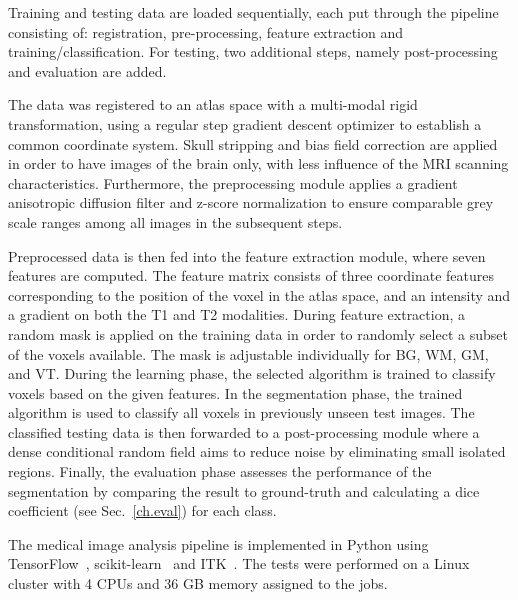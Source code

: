 \documentclass[journal]{IEEEtran}
\begin{document}
Training and testing data are loaded sequentially, each put through the pipeline consisting of: registration, pre-processing, feature extraction and training/classification. For testing, two additional steps, namely post-processing and evaluation are added.

The data was registered to an atlas space with a multi-modal rigid transformation, using a regular step gradient descent optimizer to establish a common coordinate system. Skull stripping and bias field correction are applied in order to have images of the brain only, with less influence of the MRI scanning characteristics. Furthermore, the preprocessing module applies a gradient anisotropic diffusion filter and z-score normalization to ensure comparable grey scale ranges among all images in the subsequent steps.

Preprocessed data is then fed into the feature extraction module, where seven features are computed. The feature matrix consists of three coordinate features corresponding to the position of the voxel in the atlas space, and an intensity and a gradient on both the T1 and T2 modalities. During feature extraction, a random mask is applied on the training data in order to randomly select a subset of the voxels available. The mask is adjustable individually for BG, WM, GM, and VT. During the learning phase, the selected algorithm is trained to classify voxels based on the given features. In the segmentation phase, the trained algorithm is used to classify all voxels in previously unseen test images. The classified testing data is then forwarded to a post-processing module where a dense conditional random field \cite{krahenbuhl2011efficient} aims to reduce noise by eliminating small isolated regions. Finally, the evaluation phase assesses the performance of the segmentation by comparing the result to ground-truth and calculating a dice coefficient (see Sec.~\ref{ch.eval}) for each class.

The medical image analysis pipeline is implemented in Python using TensorFlow~\cite{tensorflow2015-whitepaper}, scikit-learn~\cite{pedregosa2011scikit} and ITK~\cite{yoo2002engineering}. The tests were performed on a Linux cluster with 4 CPUs and 36 GB memory assigned to the jobs.
\end{document}
